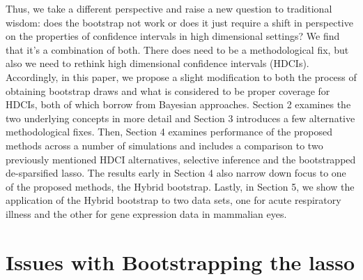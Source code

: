 Thus, we take a different perspective and raise a new question to traditional wisdom: does the bootstrap not work or does it just require a shift in perspective on the properties of confidence intervals in high dimensional settings? We find that it's a combination of both. There does need to be a methodological fix, but also we need to rethink high dimensional confidence intervals (HDCIs). Accordingly, in this paper, we propose a slight modification to both the process of obtaining bootstrap draws and what is considered to be proper coverage for HDCIs, both of which borrow from Bayesian approaches. Section 2 examines the two underlying concepts in more detail and Section 3 introduces a few alternative methodological fixes. Then, Section 4 examines performance of the proposed methods across a number of simulations and includes a comparison to two previously mentioned HDCI alternatives, selective inference and the bootstrapped de-sparsified lasso. The results early in Section 4 also narrow down focus to one of the proposed methods, the Hybrid bootstrap. Lastly, in Section 5, we show the application of the Hybrid bootstrap to two data sets, one for acute respiratory illness and the other for gene expression data in mammalian eyes.

\section{Issues with Bootstrapping the lasso}
\label{Sec:Difficulties}


